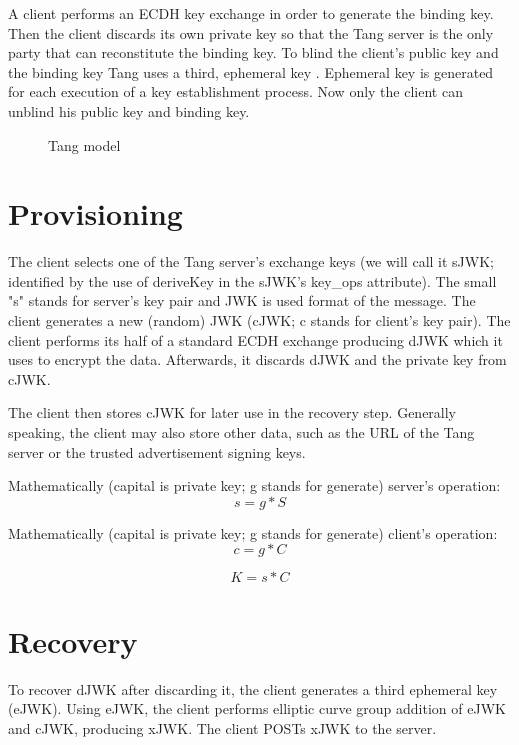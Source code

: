 \documentclass[../xdudla00-porting-Tang-to-Open-WRT.tex]{subfiles}
\begin{document}
A client performs an ECDH \cite{ecdh} key exchange in order to generate the binding key.
Then the client discards its own private key so that the Tang server is the only party that can reconstitute the binding key.
To blind the client's public key and the binding key Tang uses a third, ephemeral key \cite{epkey}.
Ephemeral key is generated for each execution of a key establishment process.
Now only the client can unblind his public key and binding key.

\begin{figure}[h]
    \centering
    \caption{Tang model}
    \label{fig:tangmodel}
\end{figure}

\section{Provisioning}
The client selects one of the Tang server's exchange keys (we will call it sJWK; identified by the use of deriveKey in the sJWK's key\_ops attribute).
The small "s" stands for server's key pair and JWK\cite{JWK} is used format of the message.
The client generates a new (random) JWK (cJWK; c stands for client's key pair).
The client performs its half of a standard ECDH exchange producing dJWK which it uses to encrypt the data.
Afterwards, it discards dJWK and the private key from cJWK.

The client then stores cJWK for later use in the recovery step.
Generally speaking, the client may also store other data, such as the URL \cite{url} of the Tang server or the trusted advertisement signing keys.

Mathematically (capital is private key; g stands for generate) server's operation:
\begin{equation}
    s = g * S
\end{equation}

Mathematically (capital is private key; g stands for generate) client's operation:
\begin{equation}
    c = g * C
\end{equation}

\begin{equation}
    K = s * C
\end{equation}

\section{Recovery}
To recover dJWK after discarding it, the client generates a third ephemeral key (eJWK).
Using eJWK, the client performs elliptic curve group addition of eJWK and cJWK, producing xJWK. The client POSTs xJWK to the server.
\end{document}
